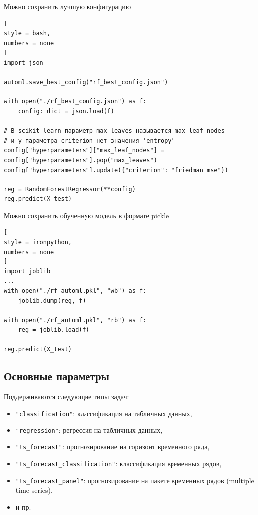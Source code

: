 \documentclass[%
	11pt,
	a4paper,
	utf8,
		]{article}
\begin{document}
Можно сохранить лучшую конфигурацию
\begin{lstlisting}[
style = bash,
numbers = none
]
import json

automl.save_best_config("rf_best_config.json")

with open("./rf_best_config.json") as f:
    config: dict = json.load(f)

# В scikit-learn параметр max_leaves называется max_leaf_nodes 
# и у параметра criterion нет значения 'entropy'
config["hyperparameters"]["max_leaf_nodes"] = config["hyperparameters"].pop("max_leaves")
config["hyperparameters"].update({"criterion": "friedman_mse"})

reg = RandomForestRegressor(**config)
reg.predict(X_test)
\end{lstlisting}

Можно сохранить обученную модель в формате pickle
\begin{lstlisting}[
style = ironpython,
numbers = none
]
import joblib
...
with open("./rf_automl.pkl", "wb") as f:
    joblib.dump(reg, f)
    
with open("./rf_automl.pkl", "rb") as f:
    reg = joblib.load(f)
    
reg.predict(X_test)
\end{lstlisting}

\subsection{Основные параметры}

Поддерживаются следующие типы задач:
\begin{itemize}
	\item \verb|"classification"|: классификация на табличных данных,
	
	\item \verb|"regression"|: регрессия на табличных данных,
	
	\item \verb|"ts_forecast"|: прогнозирование на горизонт временного ряда,
	
	\item \verb|"ts_forecast_classification"|: классификация временных рядов,
	
	\item \verb|"ts_forecast_panel"|: прогнозирование на пакете временных рядов (multiple time series),
	
	\item и пр.
\end{itemize}
\end{document}
